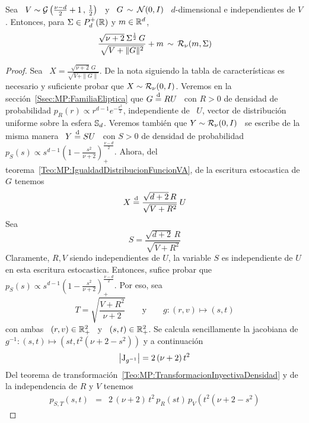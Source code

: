 %
\begin{lema}\label{Lem:MP:StudentRGamma}
%
  Sea \ $V \sim \mathcal{G}\left( \frac{\nu-d}{2}+1 \,  , \, \frac12 \right)$ \ y \ $G \,
  \sim \,  \mathcal{N}(0,I)$ \  $d$-dimensional e independientes  de $V$.  Entonces, para
  $\Sigma \in P_d^+(\mathbb{R})$ y $m \in \mathbb{R}^d$,
  \[
  \frac{\sqrt{\nu+2} \:  \Sigma^{\frac12} \, G}{\sqrt{V  + \|G\|^2}} + m \,  \sim \,
  \mathcal{R}_\nu( m , \Sigma )
  \]
\end{lema}
\begin{proof}
  Sea \ $X = \frac{\sqrt{\nu+2} \,  G}{\sqrt{V + \|G\|}}$.  De la nota siguiendo
  la tabla  de caracter\'isticas  es necesario y  suficiente probar que  $X \sim
  \mathcal{R}_\nu(0,I)$.   Veremos en  la secci\'on~\ref{Ssec:MP:FamiliaEliptica}  que $G
  \stackrel{\mathrm{d}}{=} R U$ \ con $R >  0$ de densidad de probabilidad $p_R(r) \propto r^{d-1}
  e^{-\frac{r^2}{2}}$, independiente de \ $U$, vector de distribuci\'on uniforme
  sobre la  esfera $\mathbb{S}_d$.  Veremos tambi\'en  que $Y \sim  \mathcal{R}_\nu(0,I)$ \ se
  escribe de  la misma manera  \ $Y  \stackrel{\mathrm{d}}{=} S U$  \ con $S  > 0$ de  densidad de
  probabilidad   $p_S(s)   \propto   s^{d-1}   \left(  1   -   \frac{s^2}{\nu+2}
  \right)_+^{\frac{\nu-d}{2}}$.                     Ahora,                   del
  teorema~\ref{Teo:MP:IgualdadDistribucionFuncionVA},     de     la    escritura
  estocastica de $G$ tenemos
  \[
  X \stackrel{\mathrm{d}}{=} \frac{\sqrt{d+2} \, R}{\sqrt{V + R^2}} \: U
  \]
  Sea
  \[
  S = \frac{\sqrt{d+2} \, R}{\sqrt{V + R^2}}
  \]
  Claramente,  $R,  V$  siendo  independientes   de  $U$,  la  variable  $S$  es
  independiente de  $U$ en esta  escritura estocastica. Entonces,  sufice probar
  que    $p_S(s)    \propto     s^{d-1}    \left(    1    -    \frac{s^2}{\nu+2}
  \right)_+^{\frac{\nu-d}{2}}$. Por eso, sea
  \[
  T = \sqrt{\frac{V+R^2}{\nu+2}} \qquad \mbox{y} \qquad g: (r,v) \mapsto (s,t)
  \]
  con ambas  \ $(r,v) \in  \mathbb{R}_+^2$ \ y  \ $(s,t) \in \mathbb{R}_+^2$.   Se calcula
  sencillamente  la  jacobiana  de  $g^{-1}:  (s,t)  \mapsto  \left(  s t  ,  t^2
    (\nu+2-s^2) \right)$ y a continuaci\'on
  \[
  \left| \operatorname{J}_{g^{-1}} \right| = 2 \, (\nu+2) \, t^2
  \]
  Del teorema de transformaci\'on~\ref{Teo:MP:TransformacionInyectivaDensidad} y
  de la independencia de $R$ y $V$ tenemos
  \begin{eqnarray*}
  p_{S,T}(s,t) & = & 2 \, (\nu+2) \, t^2 \, p_R(st) \, p_V\left( t^2 (\nu+2-s^2)

\end{eqnarray*}
\end{proof}
